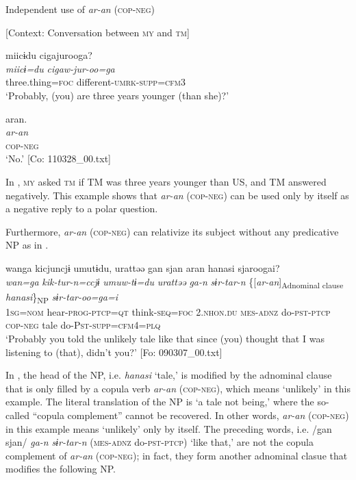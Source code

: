\ea\label{ex:8-40}
  Independent use of \textit{ar-an} (\textsc{cop}-\textsc{neg})

  [Context: Conversation between \textsc{my} and \textsc{tm}]

{\MY}
\glll  miicɨdu  cigajurooga?\\
    \textit{miicɨ=du}  \textit{cigaw-jur-oo=ga}\\
    three.thing=\textsc{foc}  different-\textsc{umrk}-\textsc{supp}=\textsc{cfm3}\\
\glt ‘Probably, (you) are three years younger (than she)?’

  {\TM}
\glll  aran.\\
\textit{ar-an}\\
    \textsc{cop}-\textsc{neg}\\
\glt ‘No.’ [Co: 110328\_00.txt]
\z

In , \textsc{my} asked \textsc{tm} if TM was three years younger than US, and TM answered negatively. This example shows that \textit{ar-an} (\textsc{cop}-\textsc{neg}) can be used only by itself as a negative reply to a polar question.

  Furthermore, \textit{ar-an} (\textsc{cop}-\textsc{neg}) can relativize its subject without any predicative NP as in .

\ea\label{ex:8-41}
  {\TM}
\glll  wanga  kicjuncjɨ  umutɨdu,  urattəə   gan  sjan  aran  hanasi  sjaroogai?\\
\textit{wan=ga}  \textit{kik-tur-n=ccjɨ}  \textit{umuw-tɨ=du}  \textit{urattəə}   \textit{ga-n}  \textit{sɨr-tar-n}  \{[\textit{ar-an}]\textsubscript{Adnominal clause}  \textit{hanasi}\}\textsubscript{NP}  \textit{sɨr-tar-oo=ga=i}\\
    1\textsc{sg}=\textsc{nom}  hear-\textsc{prog}-\textsc{ptcp}=\textsc{qt}  think-\textsc{seq}=\textsc{foc}  2.\textsc{nhon}.\textsc{du}  \textsc{mes}-\textsc{adnz}  do-\textsc{pst}-\textsc{ptcp}  \textsc{cop}-\textsc{neg}  tale  do-P\textsc{st}-\textsc{supp}=\textsc{cfm}4=\textsc{plq}\\
\glt ‘Probably you told the unlikely tale like that since (you) thought that I was listening to (that), didn’t you?’ [Fo: 090307\_00.txt]
\z

In , the head of the NP, i.e. \textit{hanasi} ‘tale,’ is modified by the adnominal clause that is only filled by a copula verb \textit{ar-an} (\textsc{cop}-\textsc{neg}), which means ‘unlikely’ in this example. The literal translation of the NP is ‘a tale not being,’ where the so-called “copula complement” cannot be recovered. In other words, \textit{ar-an} (\textsc{cop}-\textsc{neg}) in this example means ‘unlikely’ only by itself. The preceding words, i.e. /gan sjan/ \textit{ga-n} \textit{sɨr-tar-n} (\textsc{mes}-\textsc{adnz} do-\textsc{pst}-\textsc{ptcp}) ‘like that,’ are not the copula complement of \textit{ar-an} (\textsc{cop}-\textsc{neg}); in fact, they form another adnominal clasue that modifies the following NP.

